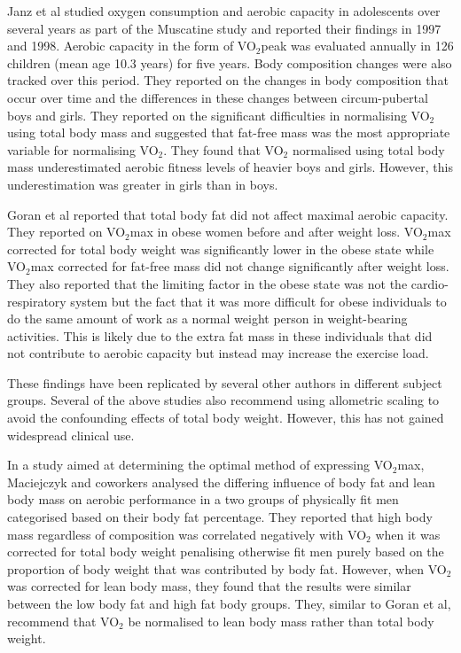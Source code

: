Janz et al studied oxygen consumption and aerobic capacity in adolescents over several years as part of the Muscatine study and reported their findings in 1997\parencite{janz_three-year_1997} and 1998.\parencite{janz_longitudinal_1998} Aerobic capacity in the form of VO$_2$peak was evaluated annually in 126 children (mean age 10.3 years) for five years. Body composition changes were also tracked over this period. They reported on the changes in body composition that occur over time and the differences in these changes between circum-pubertal boys and girls. They reported on the significant difficulties in normalising VO$_2$ using total body mass and suggested that fat-free mass was the most appropriate variable for normalising VO$_2$. They found that VO$_2$ normalised using total body mass underestimated aerobic fitness levels of heavier boys and girls. However, this underestimation was greater in girls than in boys. 

Goran et al reported that total body fat did not affect maximal aerobic capacity.\parencite{goran_total_2000} They reported on VO$_2$max in obese women before and after weight loss. VO$_2$max corrected for total body weight was significantly lower in the obese state while VO$_2$max corrected for fat-free mass did not change significantly after weight loss. They also reported that the limiting factor in the obese state was not the cardio-respiratory system but the fact that it was more difficult for obese individuals to do the same amount of work as a normal weight person in weight-bearing activities. This is likely due to the extra fat mass in these individuals that did not contribute to aerobic capacity but instead may increase the exercise load.

These findings have been replicated by several other authors in different subject groups.\parencite{loftin_scaling_2001,  lemaitre_maximum_2006,savonen_current_2012, krachler_cardiopulmonary_2014} Several of the above studies also recommend using allometric scaling to avoid the confounding effects of total body weight. However, this has not gained widespread clinical use.

In a study aimed at determining the optimal method of expressing VO$_2$max, Maciejczyk and coworkers analysed the differing influence of body fat and lean body mass on aerobic performance in a two groups of physically fit men categorised based on their body fat percentage.\parencite{maciejczyk_influence_2014} They reported that high body mass regardless of composition was correlated negatively with VO$_2$ when it was corrected for total body weight penalising otherwise fit men purely based on the proportion of body weight that was contributed by body fat. However, when VO$_2$ was corrected for lean body mass, they found that the results were similar between the low body fat and high fat body groups. They, similar to Goran et al\parencite{goran_total_2000}, recommend that VO$_2$ be normalised to lean body mass rather than total body weight.

